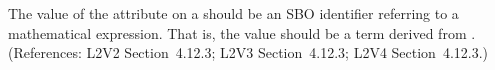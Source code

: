 The value of the  attribute on a \Constraint should be an SBO
identifier referring to a mathematical expression.  That is, the value should
be a term derived from \sbomathformula.  (References: L2V2 Section~4.12.3;
L2V3 Section~4.12.3; L2V4 Section~4.12.3.)
